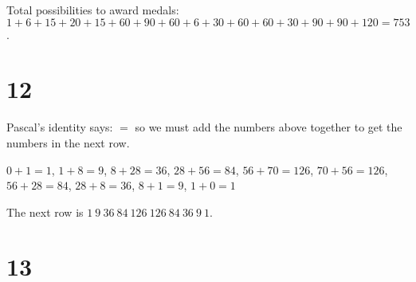 \documentclass[12pt]{article}
\begin{document}
Total possibilities to award medals: $1 + 6 + 15 + 20 + 15 + 60 + 90 + 60 + 6 + 30 + 60 + 60 + 30 + 90 + 90 + 120 = 753$.

\section*{12}
Pascal's identity says: $=$ so we must add the numbers above together to get the numbers in the next row.

$0 + 1 = 1$, $1 + 8 = 9$, $8 + 28 = 36$, $28 + 56 = 84$, $56 + 70 = 126$, $70 + 56 = 126$, $56 + 28 = 84$, $28 + 8 = 36$, $8 + 1 = 9$, $1 + 0 = 1$

The next row is $1\ 9\ 36\ 84\ 126\ 126\ 84\ 36\ 9\ 1$.

\section*{13}
\end{document}
